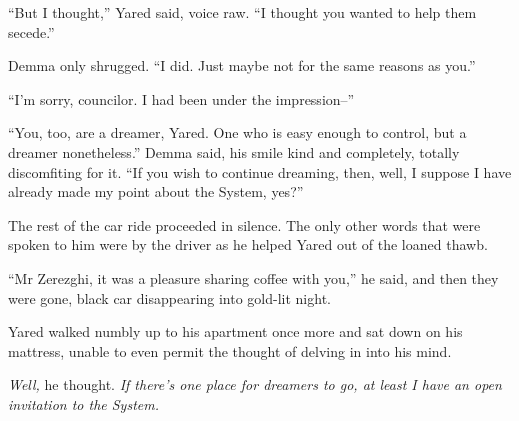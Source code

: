 ``But I thought,'' Yared said, voice raw. ``I thought you wanted to help them secede.''

Demma only shrugged. ``I did. Just maybe not for the same reasons as you.''

``I'm sorry, councilor. I had been under the impression--''

``You, too, are a dreamer, Yared. One who is easy enough to control, but a dreamer nonetheless.'' Demma said, his smile kind and completely, totally discomfiting for it. ``If you wish to continue dreaming, then, well, I suppose I have already made my point about the System, yes?''

The rest of the car ride proceeded in silence. The only other words that were spoken to him were by the driver as he helped Yared out of the loaned thawb.

``Mr Zerezghi, it was a pleasure sharing coffee with you,'' he said, and then they were gone, black car disappearing into gold-lit night.

Yared walked numbly up to his apartment once more and sat down on his mattress, unable to even permit the thought of delving in into his mind.

\emph{Well,} he thought. \emph{If there's one place for dreamers to go, at least I have an open invitation to the System.}
